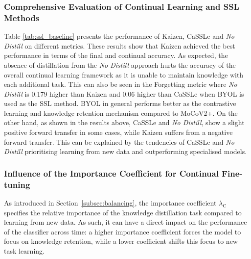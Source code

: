 \subsubsection{Comprehensive Evaluation of Continual Learning and SSL Methods}

Table \ref{tab:ssl_baseline} presents the performance of Kaizen, CaSSLe and \emph{No Distill} on different metrics. These results show that Kaizen achieved the best performance in terms of the final and continual accuracy. 
As expected, the absence of distillation from the \emph{No Distill} approach hurts the accuracy of the overall continual learning framework as it is unable to maintain knowledge with each additional task. This can also be seen in the Forgetting metric where \emph{No Distill} is 0.179 higher than Kaizen and 0.06 higher than CaSSLe when BYOL is used as the SSL method. BYOL in general performs better as the contrastive learning and knowledge retention mechanism compared to MoCoV2+. On the other hand, as shown in the results above, CaSSLe and \emph{No Distill}, show a slight positive forward transfer in some cases, while Kaizen suffers from a negative forward transfer. This can be explained by the tendencies of CaSSLe and \emph{No Distill} prioritising learning from new data and outperforming specialised models.

\subsubsection{Influence of the Importance Coefficient for Continual Fine-tuning}

As introduced in Section~\ref{subsec:balancing}, the importance coefficient $\lambda_{\mathrm{C}}$ specifies the relative importance of the knowledge distillation task compared to learning from new data. As such, it can have a direct impact on the performance of the classifier across time: a higher importance coefficient forces the model to focus on knowledge retention, while a lower coefficient shifts this focus to new task learning.

